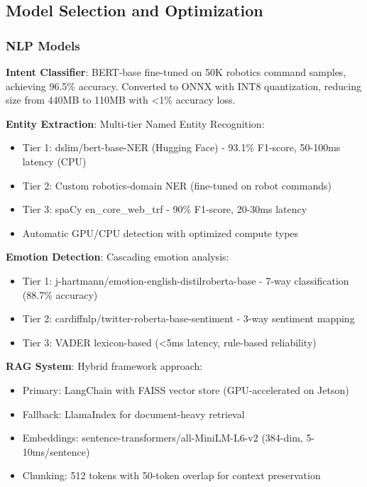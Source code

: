 \documentclass[conference]{IEEEtran}
\begin{document}
\subsection{Model Selection and Optimization}

\subsubsection{NLP Models}

\textbf{Intent Classifier}: BERT-base fine-tuned on 50K robotics command samples, achieving 96.5\% accuracy. Converted to ONNX with INT8 quantization, reducing size from 440MB to 110MB with <1\% accuracy loss.

\textbf{Entity Extraction}: Multi-tier Named Entity Recognition:
\begin{itemize}
    \item Tier 1: dslim/bert-base-NER (Hugging Face) - 93.1\% F1-score, 50-100ms latency (CPU)
    \item Tier 2: Custom robotics-domain NER (fine-tuned on robot commands)
    \item Tier 3: spaCy en\_core\_web\_trf - 90\% F1-score, 20-30ms latency
    \item Automatic GPU/CPU detection with optimized compute types
\end{itemize}

\textbf{Emotion Detection}: Cascading emotion analysis:
\begin{itemize}
    \item Tier 1: j-hartmann/emotion-english-distilroberta-base - 7-way classification (88.7\% accuracy)
    \item Tier 2: cardiffnlp/twitter-roberta-base-sentiment - 3-way sentiment mapping
    \item Tier 3: VADER lexicon-based (<5ms latency, rule-based reliability)
\end{itemize}

\textbf{RAG System}: Hybrid framework approach:
\begin{itemize}
    \item Primary: LangChain with FAISS vector store (GPU-accelerated on Jetson)
    \item Fallback: LlamaIndex for document-heavy retrieval
    \item Embeddings: sentence-transformers/all-MiniLM-L6-v2 (384-dim, 5-10ms/sentence)
    \item Chunking: 512 tokens with 50-token overlap for context preservation
\end{itemize}
\end{document}
